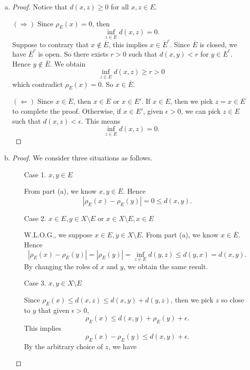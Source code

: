 \begin{Exercise}
	\begin{enumerate}[(a)]
		\item
		\begin{proof}
			Notice that $d(x,z)\geq 0$ for all $x,z\in E$.
			
			$(\Longrightarrow)$
			Since $\rho_E(x) = 0$, then
			$$
			\inf_{z\in E}d(x,z) = 0.
			$$
			Suppose to contrary that $x\notin \overline{E}$, this implies $x\in \overline{E}^c$. Since $\overline{E}$ is closed, we have $\overline{E}^c$ is open. So there exists $r>0$ such that $d(x,y)<r$ for $y\in \overline{E}^c$. Hence $y\notin \overline{E}$. We obtain
			$$
			\inf_{z\in E}d(x,z) \geq r > 0
			$$
			which contradict $\rho_E(x) = 0$. So $x\in \overline{E}$.
			
			\vspace{2ex}
			
			$(\Longleftarrow)$
			Since $x\in \overline{E}$, then $x\in E$ or $x\in E'$. If $x\in E$, then we pick $z=x\in E$ to complete the proof. Otherwise, if $x\in E'$, given $\epsilon>0$, we can pick $z\in E$ such that $d(x,z)<\epsilon$. This means
			$$
			\inf_{z\in E}d(x,z) = 0.
			$$
		\end{proof}
		
		\item 
		\begin{proof}
			We consider three situations as follows.
			
			\begin{enumerate}
				\item[Case 1.] $x,y\in E$
				
				From part (a), we know $x,y\in \overline{E}$. Hence
				$$
				\left| \rho_E(x) - \rho_E(y) \right| = 0 \leq d(x,y).
				$$
				
				\item[Case 2.] $x\in E,y\in X\setminus E$ or $x\in X\setminus E,x\in E$
				
				W.L.O.G., we suppose $x\in E,y\in X\setminus E$. From part (a), we know $x\in \overline{E}$. Hence
				$$
				\left| \rho_E(x) - \rho_E(y) \right| 
				= |\rho_E(y)| 
				= \inf_{z\in E}d(y,z)
				\leq d(y,x)
				= d(x,y).
				$$
				By changing the roles of $x$ and $y$, we obtain the same result.
				
				\item[Case 3.] $x,y\in X\setminus E$
				
				Since $\rho_E(x) \leq d(x,z) \leq d(x,y) + d(y,z)$, then we pick $z$ so close to $y$ that given $\epsilon>0$,
				$$
				\rho_E(x) \leq d(x,y) + \rho_E(y) + \epsilon.
				$$
				This implies
				$$
				\rho_E(x) - \rho_E(y) \leq d(x,y) + \epsilon.
				$$
				By the arbitrary choice of $z$, we have
				

\end{enumerate}
\end{proof}
\end{enumerate}
\end{Exercise}

